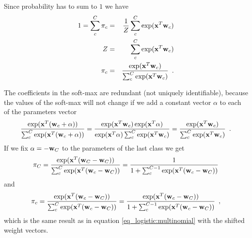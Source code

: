 Since probability has to sum to $1$ we have
\begin{eqnarray}
1 = \sum_c^C \pi_c & = &  \frac{1}{Z} \sum_c^C \exp(\mathbf{x}^T \mathbf{w}_c) \nonumber \\
Z & = &   \sum_c^C \exp(\mathbf{x}^T \mathbf{w}_c) \nonumber \\
\pi_c & = & \frac{\exp(\mathbf{x}^T \mathbf{w}_c)}{\sum_c^C \exp(\mathbf{x}^T \mathbf{w}_c)} \enspace .
\end{eqnarray}

The coefficients in the soft-max are redundant (not uniquely identifiable), because the values of the soft-max will not change if we add a constant vector $\alpha$ to each of the parameters vector
\begin{equation}
\frac{\exp(\mathbf{x}^T (\mathbf{w}_c + \alpha))}{\sum_c^C \exp(\mathbf{x}^T (\mathbf{w}_c + \alpha))} = 
\frac{\exp(\mathbf{x}^T \mathbf{w}_c) \exp(\mathbf{x}^T \alpha)}{\exp(\mathbf{x}^T \alpha) \sum_c^C \exp(\mathbf{x}^T \mathbf{w}_c)} = \frac{\exp(\mathbf{x}^T \mathbf{w}_c)}{\sum_c^C \exp(\mathbf{x}^T \mathbf{w}_c)} \enspace . 
\end{equation}
If we fix $\alpha = -\mathbf{w}_C$ to the parameters of the last class we get
\begin{equation}
\pi_C = \frac{\exp(\mathbf{x}^T (\mathbf{w}_C -\mathbf{w}_C))}{\sum_c^C \exp(\mathbf{x}^T (\mathbf{w}_c -\mathbf{w}_C))} = \frac{1}{1 + \sum_c^{C-1} \exp(\mathbf{x}^T (\mathbf{w}_c -\mathbf{w}_C))} 
\end{equation}
and 
\begin{equation}
\pi_c = \frac{\exp(\mathbf{x}^T (\mathbf{w}_c -\mathbf{w}_C))}{\sum_c^C \exp(\mathbf{x}^T (\mathbf{w}_c -\mathbf{w}_C))} = \frac{\exp(\mathbf{x}^T (\mathbf{w}_c -\mathbf{w}_C))}{1 + \sum_c^{C-1} \exp(\mathbf{x}^T (\mathbf{w}_c -\mathbf{w}_C))} \enspace ,
\end{equation}
which is the same result as in equation \eqref{eq_logistic:multinomial} with the shifted weight vectors.






